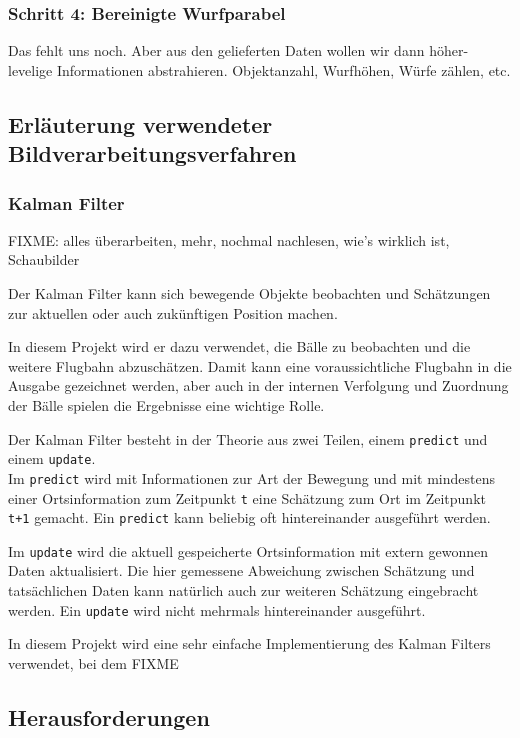 \documentclass[12pt,a4paper,ngerman]{scrartcl}
\begin{document}
\subsubsection{Schritt 4: Bereinigte Wurfparabel}

Das fehlt uns noch. Aber aus den gelieferten Daten wollen wir dann höher-levelige Informationen abstrahieren. Objektanzahl, Wurfhöhen, Würfe zählen, etc.

\subsection{Erläuterung verwendeter Bildverarbeitungsverfahren}

\subsubsection{Kalman Filter}

{\color{red} FIXME: alles überarbeiten, mehr, nochmal nachlesen, wie's wirklich ist, Schaubilder}

Der Kalman Filter kann sich bewegende Objekte beobachten und Schätzungen zur aktuellen oder auch zukünftigen Position machen.

In diesem Projekt wird er dazu verwendet, die Bälle zu beobachten und die weitere Flugbahn abzuschätzen. Damit kann eine voraussichtliche Flugbahn in die Ausgabe gezeichnet werden, aber auch in der internen Verfolgung und Zuordnung der Bälle spielen die Ergebnisse eine wichtige Rolle.

Der Kalman Filter besteht in der Theorie aus zwei Teilen, einem {\tt predict} und einem {\tt update}.\\
Im {\tt predict} wird mit Informationen zur Art der Bewegung und mit mindestens einer Ortsinformation zum Zeitpunkt {\tt t} eine Schätzung zum Ort im Zeitpunkt {\tt t+1} gemacht.
Ein {\tt predict} kann beliebig oft hintereinander ausgeführt werden.

Im {\tt update} wird die aktuell gespeicherte Ortsinformation mit extern gewonnen Daten aktualisiert. Die hier gemessene Abweichung zwischen Schätzung und tatsächlichen Daten kann natürlich auch zur weiteren Schätzung eingebracht werden. Ein {\tt update} wird nicht mehrmals hintereinander ausgeführt.

In diesem Projekt wird eine sehr einfache Implementierung des Kalman Filters verwendet, bei dem {\color{red} FIXME}

\subsection{Herausforderungen}
\end{document}
